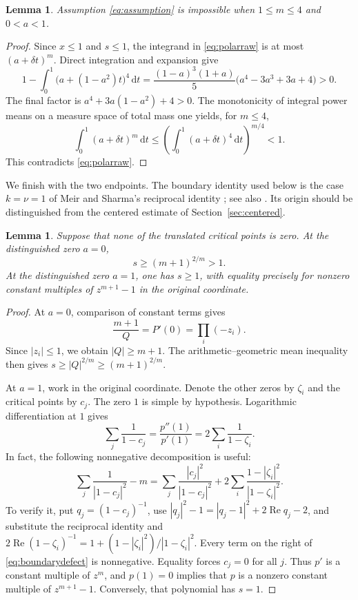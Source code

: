 \documentclass[11pt,letterpaper,reqno]{amsart}
\newtheorem{lem}[thm]{Lemma}
\theoremstyle{definition}
\numberwithin{equation}{section}
\newcommand{\dd}{\,\mathrm d}
\newcommand{\Ree}{\operatorname{Re}}
\begin{document}
\begin{lem}\label{lem:small}
Assumption \eqref{eq:assumption} is impossible when $1\le m\le4$ and $0<a<1$.
\end{lem}

\begin{proof}
Since $x\le1$ and $s\le1$, the integrand in \eqref{eq:polarraw} is at most $(a+\delta t)^m$. Direct integration and expansion give
\[
 1-\int_0^1\bigl(a+(1-a^2)t\bigr)^4\dd t
 =\frac{(1-a)^3(1+a)}5\bigl(a^4-3a^3+3a+4\bigr)>0.
\]
The final factor is $a^4+3a(1-a^2)+4>0$. The monotonicity of integral power means on a measure space of total mass one yields, for $m\le4$,
\[
 \int_0^1(a+\delta t)^m\dd t
 \le\left(\int_0^1(a+\delta t)^4\dd t\right)^{m/4}<1.
\]
This contradicts \eqref{eq:polarraw}.
\end{proof}

We finish with the two endpoints. The boundary identity used below is the case $k=\nu=1$ of Meir and Sharma's reciprocal identity \cite[p.~461, (3.2)]{MS69}; see also \cite[p.~26, (5.1) and Remark~5.1]{TZ25}. Its origin should be distinguished from the centered estimate of Section~\ref{sec:centered}.

\begin{lem}\label{lem:endpoints}
Suppose that none of the translated critical points is zero. At the distinguished zero $a=0$,
\[
 s\ge(m+1)^{2/m}>1.
\]
At the distinguished zero $a=1$, one has $s\ge1$, with equality precisely for nonzero constant multiples of $z^{m+1}-1$ in the original coordinate.
\end{lem}

\begin{proof}
At $a=0$, comparison of constant terms gives
\[
 \frac{m+1}{Q}=P'(0)=\prod_i(-z_i).
\]
Since $|z_i|\le1$, we obtain $|Q|\ge m+1$. The arithmetic--geometric mean inequality then gives $s\ge|Q|^{2/m}\ge(m+1)^{2/m}$.

At $a=1$, work in the original coordinate. Denote the other zeros by $\zeta_i$ and the critical points by $c_j$. The zero $1$ is simple by hypothesis. Logarithmic differentiation at $1$ gives
\[
 \sum_j\frac1{1-c_j}
 =\frac{p''(1)}{p'(1)}
 =2\sum_i\frac1{1-\zeta_i}.
\]
In fact, the following nonnegative decomposition is useful:
\begin{equation}\label{eq:boundarydefect}
 \sum_j\frac1{|1-c_j|^2}-m
 =\sum_j\frac{|c_j|^2}{|1-c_j|^2}
   +2\sum_i\frac{1-|\zeta_i|^2}{|1-\zeta_i|^2}.
\end{equation}
To verify it, put $q_j=(1-c_j)^{-1}$, use
$|q_j|^2-1=|q_j-1|^2+2\Ree q_j-2$, and substitute the reciprocal identity and
$2\Ree(1-\zeta_i)^{-1}=1+(1-|\zeta_i|^2)/|1-\zeta_i|^2$.
Every term on the right of \eqref{eq:boundarydefect} is nonnegative. Equality forces $c_j=0$ for all $j$. Thus $p'$ is a constant multiple of $z^m$, and $p(1)=0$ implies that $p$ is a nonzero constant multiple of $z^{m+1}-1$. Conversely, that polynomial has $s=1$.
\end{proof}
\end{document}
